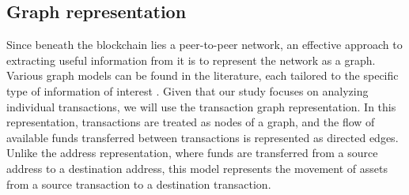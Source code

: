 \documentclass[nofootinbib,aps,prd,reprint,superscriptaddress,floatfix]{revtex4-2}
\begin{document}
\subsection{Graph representation}\label{subsec:graph_representation}

\begin{figure*}[hbtp]
	\centering
        \hspace{10mm}
    \caption{a) Schematic representation of Bitcoin's UTXO-based ledger. Outputs specify the amounts of BTC sent to specific addresses, while inputs reference the outputs of previous transactions. If an input is empty, it indicates the creation of new BTC, such as through the mining process of a block. b) Example of an address graph and its associated transaction graph. The transaction graph can be constructed from the UTXO-based ledger following the process described in Section \ref{subsec:graph_representation}.}
	\label{fig:UTXO}
\end{figure*}

Since beneath the blockchain lies a peer-to-peer network, an effective approach to extracting useful information from it is to represent the network as a graph. Various graph models can be found in the literature, each tailored to the specific type of information of interest \cite{Cryptocurrency_overview}. Given that our study focuses on analyzing individual transactions, we will use the transaction graph representation. In this representation, transactions are treated as nodes of a graph, and the flow of available funds transferred between transactions is represented as directed edges. Unlike the address representation, where funds are transferred from a source address to a destination address, this model represents the movement of assets from a source transaction to a destination transaction.
\end{document}
